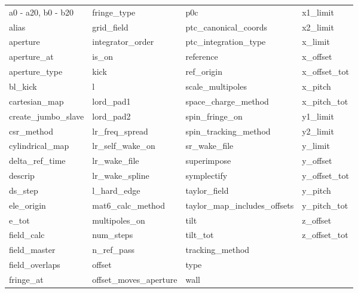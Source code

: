  \begin{tabular}{llll} \toprule
a0 - a20, b0 - b20          & fringe_type                 & p0c                         & x1_limit                    \\
alias                       & grid_field                  & ptc_canonical_coords        & x2_limit                    \\
aperture                    & integrator_order            & ptc_integration_type        & x_limit                     \\
aperture_at                 & is_on                       & reference                   & x_offset                    \\
aperture_type               & kick                        & ref_origin                  & x_offset_tot                \\
bl_kick                     & l                           & scale_multipoles            & x_pitch                     \\
cartesian_map               & lord_pad1                   & space_charge_method         & x_pitch_tot                 \\
create_jumbo_slave          & lord_pad2                   & spin_fringe_on              & y1_limit                    \\
csr_method                  & lr_freq_spread              & spin_tracking_method        & y2_limit                    \\
cylindrical_map             & lr_self_wake_on             & sr_wake_file                & y_limit                     \\
delta_ref_time              & lr_wake_file                & superimpose                 & y_offset                    \\
descrip                     & lr_wake_spline              & symplectify                 & y_offset_tot                \\
ds_step                     & l_hard_edge                 & taylor_field                & y_pitch                     \\
ele_origin                  & mat6_calc_method            & taylor_map_includes_offsets & y_pitch_tot                 \\
e_tot                       & multipoles_on               & tilt                        & z_offset                    \\
field_calc                  & num_steps                   & tilt_tot                    & z_offset_tot                \\
field_master                & n_ref_pass                  & tracking_method             &                             \\
field_overlaps              & offset                      & type                        &                             \\
fringe_at                   & offset_moves_aperture       & wall                        &                             \\
 \bottomrule
 \end{tabular}
 \vfill
 
